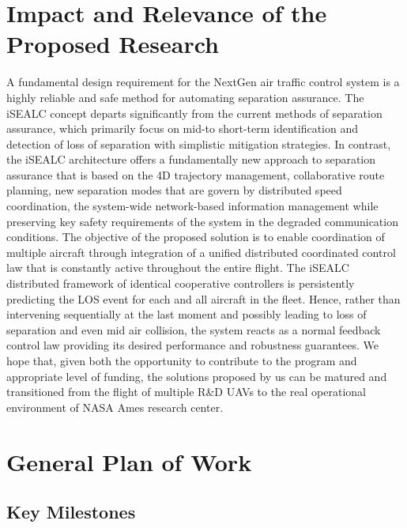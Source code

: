 \documentclass[letter,onecolumn,12pt]{aiaa-tc}
\newcommand{\1}{1_n}
\begin{document}
\section{Impact and Relevance of the Proposed Research}
A fundamental design requirement for the NextGen air traffic control system is a highly reliable and safe method for automating separation assurance. The iSEALC concept departs significantly from the current methods of separation assurance, which primarily focus on mid-to short-term identification and detection of loss of separation with simplistic mitigation strategies. In contrast, the iSEALC architecture offers a fundamentally new approach to separation assurance that is based on the 4D trajectory management, collaborative route planning, new separation modes that are govern by distributed speed coordination, the system-wide network-based information management while preserving key safety requirements of the system in the degraded communication conditions. The objective of the proposed solution is to enable coordination of multiple aircraft through integration of a unified distributed coordinated control law that is constantly active throughout the entire flight. The iSEALC distributed framework of identical cooperative controllers is persistently predicting the LOS event for each and all aircraft in the fleet. Hence, rather than intervening sequentially at the last moment and possibly leading to loss of separation and even mid air collision, the system reacts as a normal feedback control law providing its desired performance and robustness guarantees. We hope that, given both the opportunity to contribute to the program and appropriate level of funding, the solutions proposed by us can be matured and transitioned from the flight of multiple R\&D UAVs to the real operational environment of NASA Ames research center.


\section{General Plan of Work}

\subsection{Key Milestones}
\end{document}
